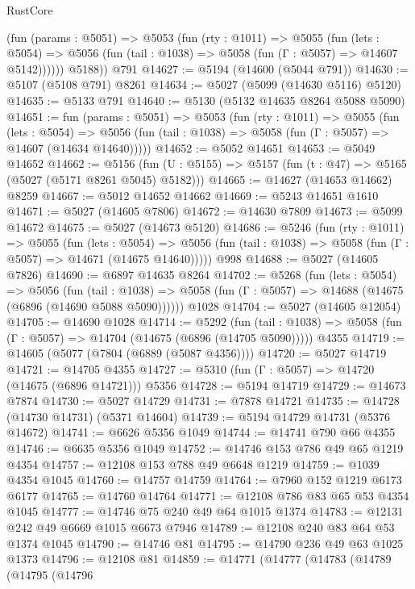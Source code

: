 \begin{lexlean}{RustCore}
\begin{coremodule}
          (fun (params : @5051) =>
          @5053
            (fun (rty : @1011) =>
            @5055
              (fun (lets : @5054) =>
              @5056 (fun (tail : @1038) => @5058 (fun (Γ : @5057) => @14607 @5142))))))
        @5188))
    @791
@14627 := @5194 (@14600 (@5044 @791))
@14630 := @5107 (@5108 @791) @8261
@14634 := @5027 (@5099 (@14630 @5116) @5120)
@14635 := @5133 @791
@14640 := @5130 (@5132 @14635 @8264 @5088 @5090)
@14651 := fun (params : @5051) =>
  @5053
    (fun (rty : @1011) =>
    @5055
      (fun (lets : @5054) =>
      @5056 (fun (tail : @1038) => @5058 (fun (Γ : @5057) => @14607 (@14634 @14640)))))
@14652 := @5052 @14651
@14653 := @5049 @14652
@14662 := @5156
    (fun (U : @5155) => @5157 (fun (t : @47) => @5165 (@5027 (@5171 @8261 @5045) @5182)))
@14665 := @14627 (@14653 @14662) @8259
@14667 := @5012 @14652 @14662
@14669 := @5243 @14651 @1610
@14671 := @5027 (@14605 @7806)
@14672 := @14630 @7809
@14673 := @5099 @14672
@14675 := @5027 (@14673 @5120)
@14686 := @5246
    (fun (rty : @1011) =>
    @5055
      (fun (lets : @5054) =>
      @5056 (fun (tail : @1038) => @5058 (fun (Γ : @5057) => @14671 (@14675 @14640)))))
    @998
@14688 := @5027 (@14605 @7826)
@14690 := @6897 @14635 @8264
@14702 := @5268
    (fun (lets : @5054) =>
    @5056
      (fun (tail : @1038) =>
      @5058 (fun (Γ : @5057) => @14688 (@14675 (@6896 (@14690 @5088 @5090))))))
    @1028
@14704 := @5027 (@14605 @12054)
@14705 := @14690 @1028
@14714 := @5292
    (fun (tail : @1038) => @5058 (fun (Γ : @5057) => @14704 (@14675 (@6896 (@14705 @5090)))))
    @4355
@14719 := @14605 (@5077 (@7804 (@6889 (@5087 @4356))))
@14720 := @5027 @14719
@14721 := @14705 @4355
@14727 := @5310 (fun (Γ : @5057) => @14720 (@14675 (@6896 @14721))) @5356
@14728 := @5194 @14719
@14729 := @14673 @7874
@14730 := @5027 @14729
@14731 := @7878 @14721
@14735 := @14728 (@14730 @14731) (@5371 @14604)
@14739 := @5194 @14729 @14731 (@5376 @14672)
@14741 := @6626 @5356 @1049
@14744 := @14741 @790 @66 @4355
@14746 := @6635 @5356 @1049
@14752 := @14746 @153 @786 @49 @65 @1219 @4354
@14757 := @12108 @153 @788 @49 @6648 @1219
@14759 := @1039 @4354 @1045
@14760 := @14757 @14759
@14764 := @7960 @152 @1219 @6173 @6177
@14765 := @14760 @14764
@14771 := @12108 @786 @83 @65 @53 @4354 @1045
@14777 := @14746 @75 @240 @49 @64 @1015 @1374
@14783 := @12131 @242 @49 @6669 @1015 @6673 @7946
@14789 := @12108 @240 @83 @64 @53 @1374 @1045
@14790 := @14746 @81
@14795 := @14790 @236 @49 @63 @1025 @1373
@14796 := @12108 @81
@14859 := @14771
    (@14777
      (@14783
        (@14789
          (@14795
            (@14796

\end{coremodule}
\end{lexlean}
